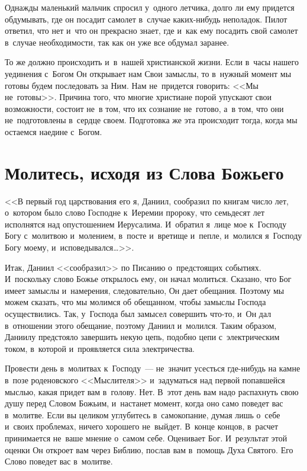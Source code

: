 \documentclass[12pt,article,a4paper,fittopage]{ncc}
\begin{document}
\begin{multicols}{2}
Однажды маленький мальчик спросил у~одного летчика, долго ли ему придется обдумывать, где он посадит самолет в~случае каких-нибудь неполадок. Пилот ответил, что нет и~что он прекрасно знает, где и~как ему посадить свой самолет в~случае необходимости, так как он уже все обдумал заранее.

То же должно происходить и~в~нашей христианской жизни. Если в~часы нашего уединения с~Богом Он открывает нам Свои замыслы, то в~нужный момент мы готовы будем последовать за Ним. Нам не~придется говорить: <<Мы не~готовы>>. Причина того, что многие христиане порой упускают свои возможности, состоит не~в том, что их сознание не~готово, а~в том, что они не~подготовлены в~сердце своем. Подготовка же эта происходит тогда, когда мы остаемся наедине с~Богом.

\section*{Молитесь, исходя из Слова Божьего}

<<В первый год царствования его я, Даниил, сообразил по книгам число лет, о~котором было слово Господне к~Иеремии пророку, что семьдесят лет исполнятся над опустошением Иерусалима. И~обратил я~лице мое к~Господу Богу с~молитвою и~молением, в~посте и~вретище и~пепле, и~молился я~Господу Богу моему, и~исповедывался\ldots>>.

Итак, Даниил <<сообразил>> по Писанию о~предстоящих событиях. И~поскольку слово Божье открылось ему, он начал молиться. Сказано, что Бог имеет замыслы и~намерения, следовательно, Он дает обещания. Поэтому мы можем сказать, что мы молимся об обещанном, чтобы замыслы Господа осуществились. Так, у~Господа был замысел совершить что-то, и~Он дал в~отношении этого обещание, поэтому Даниил и~молился. Таким образом, Даниилу предстояло завершить некую цепь, подобно цепи с~электрическим током, в~которой и~проявляется сила электричества.

Провести день в~молитвах к~Господу~--- не~значит усесться где-нибудь на камне в~позе роденовского <<Мыслителя>> и~задуматься над первой попавшейся мыслью, какая придет вам в~голову. Нет. В~этот день вам надо распахнуть свою душу перед Словом Божьим, и~настанет момент, когда оно само поведет вас в~молитве. Если вы целиком углубитесь в~самокопание, думая лишь о~себе и~своих проблемах, ничего хорошего не~выйдет. В~конце концов, в~расчет принимается не~ваше мнение о~самом себе. Оценивает Бог. И~результат этой оценки Он откроет вам через Библию, послав вам в~помощь Духа Святого. Его Слово поведет вас в~молитве.


\end{multicols}
\end{document}
